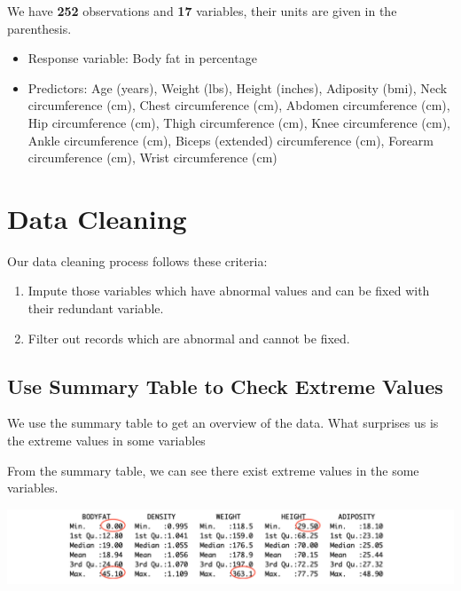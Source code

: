 \documentclass[11pt]{article}
\makeatletter
\def\maxwidth{\ifdim\Gin@nat@width>\linewidth\linewidth
    \else\Gin@nat@width\fi}
\let\Oldincludegraphics\includegraphics
\renewcommand{\includegraphics}[1]{\Oldincludegraphics[width=.8\maxwidth]{#1}}
\providecommand{\tightlist}{%
      \setlength{\itemsep}{0pt}\setlength{\parskip}{0pt}}
\makeatother
\begin{document}
    We have \textbf{252} observations and \textbf{17} variables, their units
are given in the parenthesis.

\begin{itemize}
\tightlist
\item
  Response variable: Body fat in percentage
\item
  Predictors: Age (years), Weight (lbs), Height (inches), Adiposity
  (bmi), Neck circumference (cm), Chest circumference (cm), Abdomen
  circumference (cm), Hip circumference (cm), Thigh circumference (cm),
  Knee circumference (cm), Ankle circumference (cm), Biceps (extended)
  circumference (cm), Forearm circumference (cm), Wrist circumference
  (cm)
\end{itemize}

    \hypertarget{data-cleaning}{%
\section{Data Cleaning}\label{data-cleaning}}

Our data cleaning process follows these criteria:

\begin{enumerate}
\def\labelenumi{\arabic{enumi}.}
\tightlist
\item
  Impute those variables which have abnormal values and can be fixed
  with their redundant variable.
\item
  Filter out records which are abnormal and cannot be fixed.
\end{enumerate}

\hypertarget{use-summary-table-to-check-extreme-values}{%
\subsection{Use Summary Table to Check Extreme
Values}\label{use-summary-table-to-check-extreme-values}}

We use the summary table to get an overview of the data. What surprises
us is the extreme values in some variables

    From the summary table, we can see there exist extreme values in the
some variables.

\includegraphics{plots/summary.png}
\end{document}
